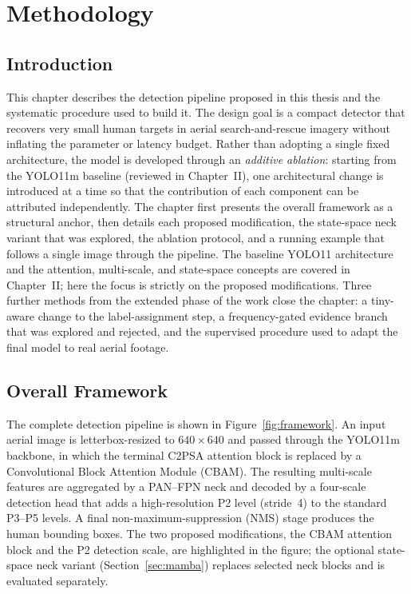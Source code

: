 \chapter{Methodology}

\section{Introduction}
This chapter describes the detection pipeline proposed in this thesis and the
systematic procedure used to build it. The design goal is a compact detector
that recovers very small human targets in aerial search-and-rescue imagery
without inflating the parameter or latency budget. Rather than adopting a single
fixed architecture, the model is developed through an \emph{additive ablation}:
starting from the YOLO11m baseline (reviewed in Chapter~II), one architectural
change is introduced at a time so that the contribution of each component can be
attributed independently. The chapter first presents the overall framework as a
structural anchor, then details each proposed modification, the state-space neck
variant that was explored, the ablation protocol, and a running example that
follows a single image through the pipeline. The baseline YOLO11 architecture and
the attention, multi-scale, and state-space concepts are covered in Chapter~II;
here the focus is strictly on the proposed modifications. Three further methods from
the extended phase of the work close the chapter: a tiny-aware change to the
label-assignment step, a frequency-gated evidence branch that was explored and
rejected, and the supervised procedure used to adapt the final model to real
aerial footage.

\section{Overall Framework}
The complete detection pipeline is shown in Figure~\ref{fig:framework}. An input
aerial image is letterbox-resized to $640 \times 640$ and passed through the
YOLO11m backbone, in which the terminal C2PSA attention block is replaced by a
Convolutional Block Attention Module (CBAM). The resulting multi-scale features
are aggregated by a PAN--FPN neck and decoded by a four-scale detection head that
adds a high-resolution P2 level (stride~4) to the standard P3--P5 levels. A final
non-maximum-suppression (NMS) stage produces the human bounding boxes. The two
proposed modifications, the CBAM attention block and the P2 detection scale,
are highlighted in the figure; the optional state-space neck variant
(Section~\ref{sec:mamba}) replaces selected neck blocks and is evaluated
separately.

